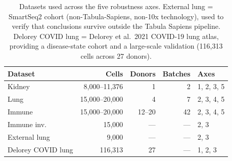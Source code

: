 \documentclass[12pt]{article}
\providecommand{\DIFaddbegin}{} %
\providecommand{\DIFaddend}{} %
\providecommand{\DIFdelbegin}{} %
\providecommand{\DIFdelend}{} %
\begin{document}
\DIFdelbegin %
\DIFdelend \DIFaddbegin \begin{table}[ht]
\centering
\caption{Datasets used across the five robustness axes. External lung =
\citet{Travaglini2020} SmartSeq2 cohort (non-Tabula-Sapiens, non-10x
technology), used to verify that conclusions survive outside the
Tabula Sapiens pipeline. Delorey COVID lung = Delorey et al.\ 2021
COVID-19 lung atlas, providing a disease-state cohort and a
large-scale validation (116{,}313 cells across 27 donors).}
\label{tab:datasets}
\small
\begin{tabular}{lrrrl}
\toprule
\textbf{Dataset} & \textbf{Cells} & \textbf{Donors} & \textbf{Batches} & \textbf{Axes} \\
\midrule
Kidney              & 8{,}000--11{,}376  & 1    & 2  & 1, 2, 3, 5 \\
Lung                & 15{,}000--20{,}000 & 4    & 7  & 2, 3, 4, 5 \\
Immune              & 15{,}000--20{,}000 & 12--20 & 42 & 2, 3, 4, 5 \\
Immune inv.         & 15{,}000           & ---  & --- & 2, 3 \\
External lung       & 9{,}000            & ---  & --- & 2, 3 \\
Delorey COVID lung  & 116{,}313          & 27   & --- & 1, 2, 3 \\
\bottomrule
\end{tabular}
\end{table}
\DIFaddend 
\end{document}
